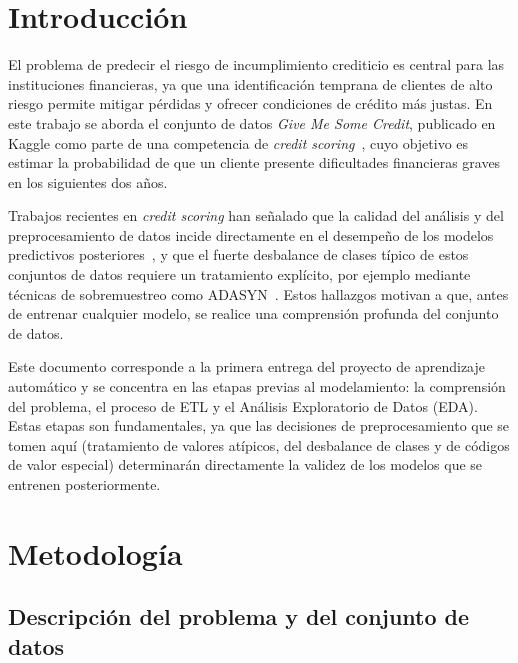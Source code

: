 \documentclass[pdflatex,sn-mathphys-num]{sn-jnl}
\begin{document}
\section{Introducción}\label{sec:intro}

El problema de predecir el riesgo de incumplimiento crediticio es central para las instituciones financieras, ya que una identificación temprana de clientes de alto riesgo permite mitigar pérdidas y ofrecer condiciones de crédito más justas. En este trabajo se aborda el conjunto de datos \textit{Give Me Some Credit}, publicado en Kaggle como parte de una competencia de \textit{credit scoring}~\cite{gmsc}, cuyo objetivo es estimar la probabilidad de que un cliente presente dificultades financieras graves en los siguientes dos años.

Trabajos recientes en \textit{credit scoring} han señalado que la calidad del análisis y del preprocesamiento de datos incide directamente en el desempeño de los modelos predictivos posteriores~\cite{ichim2025credit}, y que el fuerte desbalance de clases típico de estos conjuntos de datos requiere un tratamiento explícito, por ejemplo mediante técnicas de sobremuestreo como ADASYN~\cite{chia2025adasyn}. Estos hallazgos motivan a que, antes de entrenar cualquier modelo, se realice una comprensión profunda del conjunto de datos.

Este documento corresponde a la primera entrega del proyecto de aprendizaje automático y se concentra en las etapas previas al modelamiento: la comprensión del problema, el proceso de ETL y el Análisis Exploratorio de Datos (EDA). Estas etapas son fundamentales, ya que las decisiones de preprocesamiento que se tomen aquí (tratamiento de valores atípicos, del desbalance de clases y de códigos de valor especial) determinarán directamente la validez de los modelos que se entrenen posteriormente.

\section{Metodología}\label{sec:metodologia}

\subsection{Descripción del problema y del conjunto de datos}\label{subsec:datos}
\end{document}
